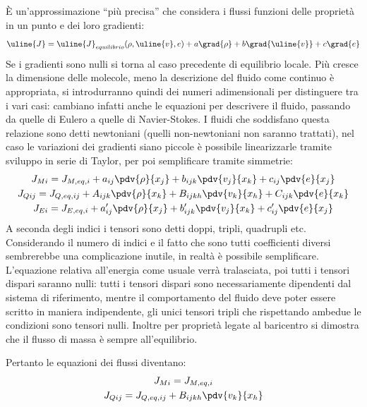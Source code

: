 È un'approssimazione ``più precisa'' che considera i flussi funzioni delle proprietà in un punto e dei loro gradienti:
%
	\begin{equation*}
		\uline{J} = \uline{J}_{equilibrio}(\rho, \uline{v}, e) + a \grad{\rho} + b \grad{\uline{v}} + c \grad{e}
	\end{equation*}
%
Se i gradienti sono nulli si torna al caso precedente di equilibrio locale.
Più cresce la dimensione delle molecole, meno la descrizione del fluido come continuo è appropriata, si introdurranno quindi dei numeri adimensionali per distinguere tra i vari casi: cambiano infatti anche le equazioni per descrivere il fluido, passando da quelle di Eulero a quelle di Navier-Stokes.
I fluidi che soddisfano questa relazione sono detti newtoniani (quelli non-newtoniani non saranno trattati), nel caso le variazioni dei gradienti siano piccole è possibile linearizzarle tramite sviluppo in serie di Taylor, per poi semplificare tramite simmetrie:
%
	\begin{equation*}
		\begin{gathered}
			J_{Mi} = J_{M,eq,i}  + a_{ij} \pdv{\rho}{x_j} + b_{ijk} \pdv{v_j}{x_k} + c_{ij} \pdv{e}{x_j}\\
			J_{Qij} = J_{Q,eq,ij} + A_{ijk} \pdv{\rho}{x_k} + B_{ijkh} \pdv{v_k}{x_h} + C_{ijk} \pdv{e}{x_k}\\
			J_{Ei} = J_{E,eq,i} + a'_{ij} \pdv{\rho}{x_j} + b'_{ijk} \pdv{v_j}{x_k} + c'_{ij} \pdv{e}{x_j}
		\end{gathered}
	\end{equation*}
%
A seconda degli indici i tensori sono detti doppi, tripli, quadrupli etc.
Considerando il numero di indici e il fatto che sono tutti coefficienti diversi sembrerebbe una complicazione inutile, in realtà è possibile semplificare.
L'equazione relativa all'energia come usuale verrà tralasciata, poi tutti i tensori dispari saranno nulli: tutti i tensori dispari sono necessariamente dipendenti dal sistema di riferimento, mentre il comportamento del fluido deve poter essere scritto in maniera indipendente, gli unici tensori tripli che rispettando ambedue le condizioni sono tensori nulli.
Inoltre per proprietà legate al baricentro si dimostra che il flusso di massa è sempre all'equilibrio.

Pertanto le equazioni dei flussi diventano:
%
	\begin{equation*}
		\begin{gathered}
			J_{Mi} = J_{M,eq,i} \\
			J_{Qij} = J_{Q,eq,ij} + B_{ijkh} \pdv{v_k}{x_h}\\
		\end{gathered}
	\end{equation*}
%

